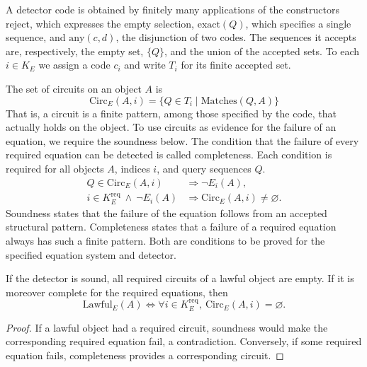 \begin{definition}\label{def:1.15}

A detector code is obtained by finitely many applications of the constructors
$\mathrm{reject}$, which expresses the empty selection, $\mathrm{exact}(Q)$,
which specifies a single sequence, and $\mathrm{any}(c,d)$, the disjunction of
two codes.
The sequences it accepts are, respectively, the empty set, $\{Q\}$, and the union
of the accepted sets.
To each $i\in K_E$ we assign a code $c_i$ and write $T_i$ for its finite
accepted set.

The set of circuits on an object $A$ is
\[
\mathrm{Circ}_E(A,i)=\{Q\in T_i\mid\mathrm{Matches}(Q,A)\}
\]
That is, a circuit is a finite pattern, among those specified by the code, that actually holds
on the object.
To use circuits as evidence for the failure of an equation, we require the
soundness below.
The condition that the failure of every required equation can be detected is
called completeness.
Each condition is required for all objects $A$, indices $i$, and query
sequences $Q$.
\[
\begin{aligned}
Q\in\mathrm{Circ}_E(A,i)&\Longrightarrow \neg E_i(A),\\
i\in K_E^{\mathrm{req}}\ \land\ \neg E_i(A)
&\Longrightarrow\mathrm{Circ}_E(A,i)\ne\varnothing.
\end{aligned}
\]
Soundness states that the failure of the equation follows from an accepted
structural pattern.
Completeness states that a failure of a required equation always has such a
finite pattern.
Both are conditions to be proved for the specified equation system and detector.

\end{definition}

\begin{proposition}\label{prop:1.16}

If the detector is sound, all required circuits of a lawful object are empty.
If it is moreover complete for the required equations, then
\[
\mathrm{Lawful}_E(A)
\Longleftrightarrow
\forall i\in K_E^{\mathrm{req}},\
\mathrm{Circ}_E(A,i)=\varnothing.
\]

\end{proposition}

\begin{proof}

If a lawful object had a required circuit, soundness would make the
corresponding required equation fail, a contradiction.
Conversely, if some required equation fails, completeness provides a
corresponding circuit.

\end{proof}

